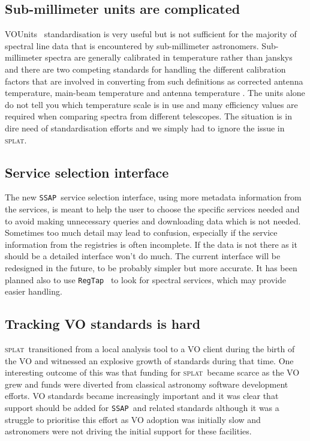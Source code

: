 \documentclass[final,authoryear,5p,times,twocolumn]{elsarticle}
\newcommand{\ssap}{\texttt{SSAP}}
\newcommand{\regtap}{\texttt{RegTap}}
\newcommand{\vounits}{VOUnits}
\newcommand{\splat}{\textsc{splat}}
\begin{document}
\subsection{Sub-millimeter units are complicated}

\vounits\ \citep{vounits} standardisation is very useful but is not
sufficient for the majority of spectral line data that is encountered
by sub-millimeter astronomers. Sub-millimeter spectra are generally
calibrated in temperature rather than janskys and there are two
competing standards for handling the different calibration factors
that are involved in converting from such definitions as corrected
antenna temperature, main-beam temperature and antenna temperature
\citep{1981ApJ...250..341K,1989LNP...333..351D,2009tra..book.....W}. The
units alone do not tell you which temperature scale is in use and many
efficiency values are required when comparing spectra from different
telescopes. The situation is in dire need of standardisation efforts
and we simply had to ignore the issue in \splat.

\subsection{Service selection interface}

The new \ssap\ service selection interface, using more metadata
information from the services, is meant to help the user to choose the
specific services needed and to avoid making unnecessary queries and
downloading data which is not needed. Sometimes too much detail may
lead to confusion, especially if the service information from the
registries is often incomplete. If the data is not there as it should
be a detailed interface won't do much. The current interface will be
redesigned in the future, to be probably simpler but more accurate. It has
been planned also to use \regtap\ \citep{regtap} to look for spectral services, which
may provide easier handling.

\subsection{Tracking VO standards is hard}

\splat\ transitioned from a local analysis tool to a VO client during
the birth of the VO and witnessed an explosive growth of standards
during that time. One interesting outcome of this was that funding for
\splat\ became scarce as the VO grew and funds were diverted from
classical astronomy software development efforts. VO standards became
increasingly important and it was clear that support should be added
for \ssap\ and related standards although it was a struggle to
prioritise this effort as VO adoption was initially slow and
astronomers were not driving the initial support for these
facilities. 
\end{document}
